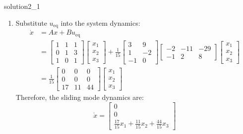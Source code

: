 \begin{solution}{}{solution2_1}
\begin{enumerate}
		\item Substitute \( u_{\text{eq}} \) into the system dynamics:
		      \[
			      \begin{aligned}
				      \dot{x} & = Ax + Bu_{\text{eq}} \\
				              & = \begin{bmatrix}
					                  1 & 1 & 1 \\
					                  0 & 1 & 3 \\
					                  1 & 0 & 1
				                  \end{bmatrix}
				      \begin{bmatrix}
					      x_1 \\x_2\\x_3
				      \end{bmatrix}
				      + \frac{1}{15}
				      \begin{bmatrix}
					      3  & 9  \\
					      1  & -2 \\
					      -1 & 0
				      \end{bmatrix}
				      \begin{bmatrix}
					      -2 & -11 & -29 \\
					      -1 & 2   & 8
				      \end{bmatrix}
				      \begin{bmatrix}
					      x_1 \\x_2\\x_3
				      \end{bmatrix}                  \\
				              & = \frac{1}{15}
				      \begin{bmatrix}
					      0  & 0  & 0  \\
					      0  & 0  & 0  \\
					      17 & 11 & 44
				      \end{bmatrix}
				      \begin{bmatrix}
					      x_1 \\x_2\\x_3
				      \end{bmatrix}
			      \end{aligned}
		      \]
                Therefore, the sliding mode dynamics are:
                \[
                    \dot{x} = \begin{bmatrix}
                        0 \\
                        0 \\
                        \frac{17}{15}x_1 + \frac{11}{15}x_2 + \frac{44}{15}x_3
                    \end{bmatrix}
                \]
	\end{enumerate}

\end{solution}
